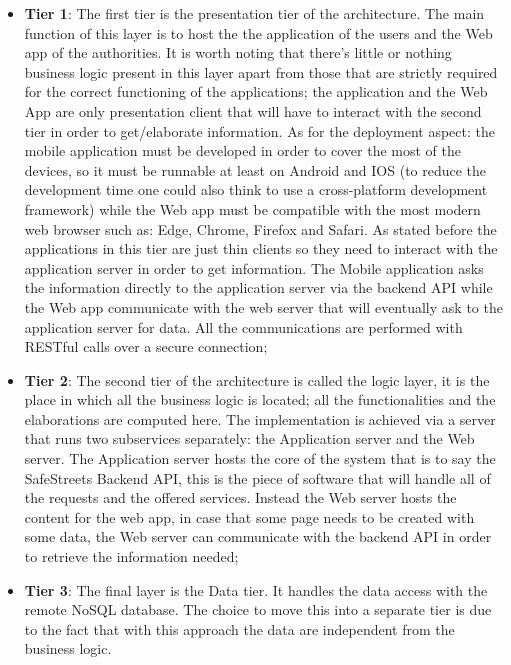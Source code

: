 \begin{itemize}
  \item \textbf{Tier 1}: The first tier is the presentation tier of the architecture. The main function of this layer is to host the  the application of the users and the Web app of the authorities. It is worth noting that there's little or nothing business logic present in this layer apart from those that are strictly required for the correct functioning of the applications; the application and the Web App are only presentation client that will have to interact with the second tier in order to get/elaborate information. As for the deployment aspect: the mobile application must be developed in order to cover the most of the devices, so it must be runnable at least on Android and IOS (to reduce the development time one could also think to use a cross-platform development framework) while the Web app must be compatible with the most modern web browser such as: Edge, Chrome, Firefox and Safari. As stated before the applications in this tier are just thin clients so they need to interact with the application server in order to get information. The Mobile application asks the information directly to the application server via the backend API while the Web app communicate with the web server that will eventually ask to the application server for data. All the communications are performed with RESTful calls over a secure connection;
  \item \textbf{Tier 2}: The second tier of the architecture is called the logic layer, it is the place in which all the business logic is located; all the functionalities and the elaborations are computed here. The implementation is achieved via a server that runs two subservices separately: the Application server and the Web server. The Application server hosts the core of the system that is to say the SafeStreets Backend API, this is the piece of software that will handle all of the requests and the offered services. Instead the Web server hosts the content for the web app, in case that some page needs to be created with some data, the Web server can communicate with the backend API in order to retrieve the information needed;
  \item \textbf{Tier 3}: The final layer is the Data tier. It handles the data access with the remote NoSQL database. The    choice to move this into a separate tier is due to the fact       that with this approach the data are independent from the         business logic.
\end{itemize}
